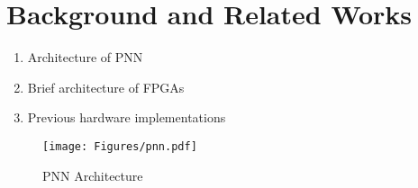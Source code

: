 \section{Background and Related Works}
\label{sec_related}

\begin{enumerate}
\item Architecture of PNN
\item Brief architecture of FPGAs
\item Previous hardware implementations
\end{enumerate}

\begin{figure}[t]
\centering
   \texttt{[image: Figures/pnn.pdf]}
   \label{fig:pnn}
   \caption{PNN Architecture}
\end{figure}

\cite{Zhou2010,Figueiredo1998,Ovtcharov2015,Zhu2010,Shima2007,Bu2004,Zhang2015}